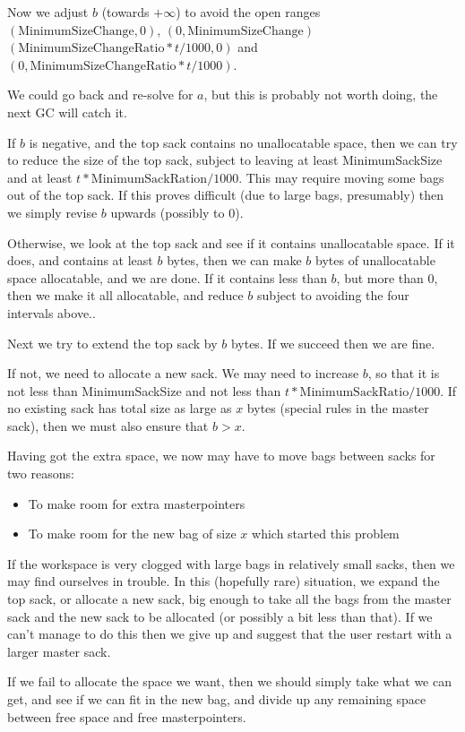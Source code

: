 \documentclass[12pt]{article}
\begin{document}
Now we adjust $b$ (towards $+\infty$) to avoid the open ranges
$(\mbox{MinimumSizeChange},0)$, $(0,\mbox{MinimumSizeChange})$
$(\mbox{MinimumSizeChangeRatio}*t/1000,0)$ and
$(0,\mbox{MinimumSizeChangeRatio}*t/1000)$.

We could go back and re-solve for $a$, but this is probably not worth
doing, the next GC will catch it.

If $b$ is negative, and the top sack contains no unallocatable space,
then we can try to reduce the size of the top sack, subject to leaving 
at least MinimumSackSize and at least
$t*\mbox{MinimumSackRation}/1000$. This may require moving some
bags out of the top sack. If this proves difficult (due to large bags, 
presumably) then we simply revise $b$ upwards (possibly to 0).


Otherwise, we look at the top sack and see if it contains unallocatable
space. If it does, and contains at least $b$ bytes, then we can make
$b$ bytes of unallocatable space allocatable, and we are done. If it
contains less than $b$, but more than 0, then we make it all
allocatable, and reduce $b$ subject to avoiding the four intervals above.. 

Next we try to extend the top sack by $b$ bytes. If we succeed then we 
are fine.

If not, we need to allocate a new sack. We may need to increase $b$,
so that it is not less than MinimumSackSize and not less than
$t*\mbox{MinimumSackRatio}/1000$. If no existing sack has total size
as large as $x$ bytes (special rules in the master sack), then we must 
also ensure that $b > x$.

Having got the extra space, we now may have to move bags between sacks 
for two reasons:
\begin{itemize}
\item To make room for extra masterpointers
\item To make room for the new bag of size $x$ which started this
problem
\end{itemize}

If the workspace is very clogged with large bags in relatively small
sacks, then we may find ourselves in trouble. In this (hopefully rare)
situation, we expand the top sack, or allocate a new sack, big enough
to take all the bags from the master sack and the new sack to be
allocated (or possibly a bit less than that).  If we can't manage to
do this then we give up and suggest that the user restart with a
larger master sack.



If we fail to allocate the space we want, then we should simply take
what we can get, and see if we can fit in the new bag, and divide up
any remaining space between free space and free masterpointers.
\end{document}
